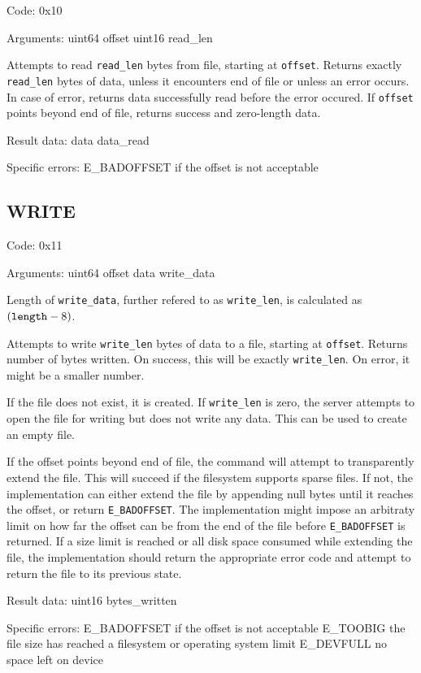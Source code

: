 Code: 0x10

Arguments:
uint64 offset
uint16 read\_len

Attempts to read {\tt read\_len} bytes from file, starting at {\tt offset}. Returns exactly {\tt read\_len}
bytes of data, unless it encounters end of file or unless an error occurs. In case of error, returns data
successfully read before the error occured. If {\tt offset} points beyond end of file, returns success and
zero-length data.

Result data:
data data\_read

Specific errors:
	E\_BADOFFSET if the offset is not acceptable

\subsection{WRITE}
\label{ssec:WRITE}

Code: 0x11

Arguments:
uint64 offset
data write\_data

Length of {\tt write\_data}, further refered to as {\tt write\_len}, is calculated as $({\tt length} - 8)$.

Attempts to write {\tt write\_len} bytes of data to a file, starting at {\tt offset}. Returns number of
bytes written. On success, this will be exactly {\tt write\_len}. On error, it might be a smaller number.

If the file does not exist, it is created. If {\tt write\_len} is zero, the server attempts to open the file
for writing but does not write any data. This can be used to create an empty file.

If the offset points beyond end of file, the command will attempt to transparently extend the file. This will
succeed if the filesystem supports sparse files. If not, the implementation can either extend the file by
appending null bytes until it reaches the offset, or return {\tt E\_BADOFFSET}. The implementation might
impose an arbitraty limit on how far the offset can be from the end of the file before {\tt E\_BADOFFSET} is
returned. If a size limit is reached or all disk space consumed while extending the file, the implementation
should return the appropriate error code and attempt to return the file to its previous state.

Result data:
uint16 bytes\_written

Specific errors:
	E\_BADOFFSET if the offset is not acceptable
	E\_TOOBIG the file size has reached a filesystem or operating system limit
	E\_DEVFULL no space left on device

